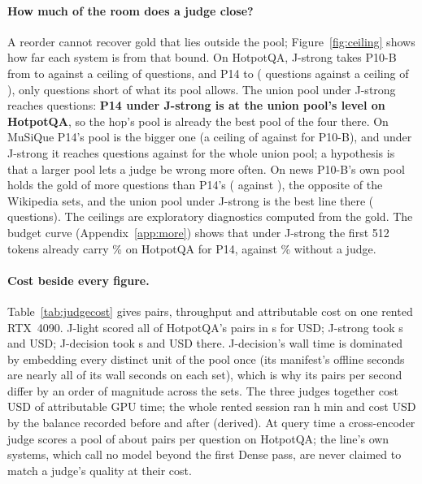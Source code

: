 \paragraph{How much of the room does a judge close?} A reorder cannot recover gold that lies outside the
pool; Figure~\ref{fig:ceiling} shows how far each system is from that bound. On HotpotQA, J-strong takes P10-B
from \fsPctPTenBHotpot{} to \fsPctStrongPTenBHotpot{} against a ceiling of
\ceilPTenBHotpot{} questions, and P14 to \fsPctStrongPFourteenHotpot{} (\fsStrongPFourteenHotpot{} questions
against a ceiling of \ceilPFourteenHotpot{}), only \ceilFailStrongPFourteenHotpot{} questions short of what its pool
allows. The union pool under J-strong reaches \fsStrongUnionHotpot{} questions: \textbf{P14 under J-strong
is at the union pool's level on HotpotQA}, so the hop's pool is already the best pool of the four there. On
MuSiQue P14's pool is the bigger one (a ceiling of \ceilPFourteenMusique{} against \ceilPTenBMusique{} for
P10-B), and under J-strong it reaches \fsStrongPFourteenMusique{} questions against \fsStrongUnionMusique{}
for the whole union pool; a hypothesis is that a larger pool lets a judge be wrong more often. On news P10-B's own pool
holds the gold of more questions than P14's (\ceilPTenBMultihop{} against \ceilPFourteenMultihop{}),
the opposite of the Wikipedia sets, and the union pool under J-strong is the best
line there (\fsStrongUnionMultihop{} questions). The ceilings are exploratory diagnostics computed from the gold.
The budget curve (Appendix~\ref{app:more}) shows that under J-strong the first 512 tokens already carry
\fsBudgetFiveTwelveStrongPFourteenHotpot{}\% on HotpotQA for P14, against \fsBudgetFiveTwelvePFourteenHotpot{}\%
without a judge.

\paragraph{Cost beside every figure.}
\begin{table}[t]
\centering
\small
\caption{\capJudgeCost}
\label{tab:judgecost}
\end{table}
Table~\ref{tab:judgecost} gives pairs, throughput and attributable cost on one rented RTX~4090. J-light
scored all of HotpotQA's pairs in \wallSecLightHotpot{} s for \usdLightHotpot{} USD; J-strong took
\wallSecStrongHotpot{} s and \usdStrongHotpot{} USD; J-decision took \wallSecDecisionHotpot{} s and
\usdDecisionHotpot{} USD there. J-decision's wall time is dominated by embedding every distinct unit of
the pool once (its manifest's offline seconds are nearly all of its wall seconds on each set), which is why its pairs per second differ by an order of magnitude across the sets. The
three judges together cost \usdGpuAttributable{} USD of attributable GPU time; the whole rented session ran
\sessionHours{} h \sessionMinutes{} min and cost \usdSession{} USD by the balance recorded before and after
(derived). At query time a cross-encoder judge scores a pool of about \poolMeanHotpot{} pairs per
question on HotpotQA; the line's own systems, which call no model beyond the first Dense pass, are
never claimed to match a judge's quality at their cost.
